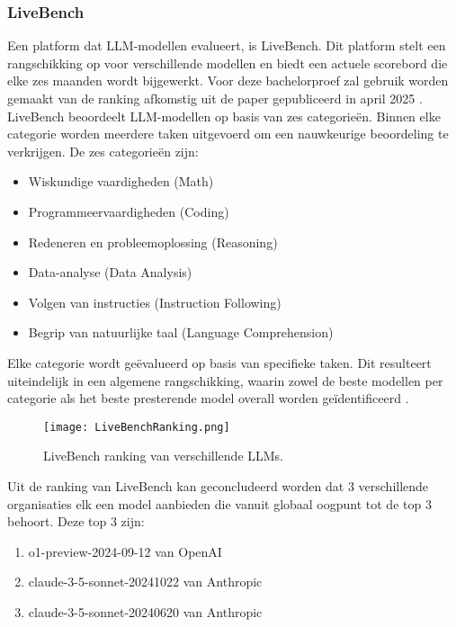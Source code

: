 \subsubsection{LiveBench} 
Een platform dat LLM-modellen evalueert, is LiveBench. Dit platform stelt een rangschikking op voor verschillende modellen en biedt een actuele scorebord die elke zes maanden wordt bijgewerkt. Voor deze bachelorproef zal gebruik worden gemaakt van de ranking afkomstig uit de paper gepubliceerd in april 2025 \autocite{livebench}.
\\[1em]
LiveBench beoordeelt LLM-modellen op basis van zes categorieën. Binnen elke categorie worden meerdere taken uitgevoerd om een nauwkeurige beoordeling te verkrijgen. De zes categorieën zijn:
\begin{itemize}
    \item Wiskundige vaardigheden (Math)
    \item Programmeervaardigheden (Coding)
    \item Redeneren en probleemoplossing (Reasoning)
    \item Data-analyse (Data Analysis)
    \item Volgen van instructies (Instruction Following)
    \item Begrip van natuurlijke taal (Language Comprehension)
\end{itemize}

Elke categorie wordt geëvalueerd op basis van specifieke taken. Dit resulteert uiteindelijk in een algemene rangschikking, waarin zowel de beste modellen per categorie als het beste presterende model overall worden geïdentificeerd \autocite{livebench}.

\begin{figure}[H]
    \centering
    \texttt{[image: LiveBenchRanking.png]}
    \caption{LiveBench ranking van verschillende LLMs.}
    \label{fig:livebench}
\end{figure}

Uit de ranking van LiveBench kan geconcludeerd worden dat 3 verschillende organisaties elk een model aanbieden die vanuit globaal oogpunt tot de top 3 behoort. Deze top 3 zijn: 
\begin{enumerate}
    \item o1-preview-2024-09-12 van OpenAI
    \item claude-3-5-sonnet-20241022 van Anthropic
    \item claude-3-5-sonnet-20240620 van Anthropic
\end{enumerate}

